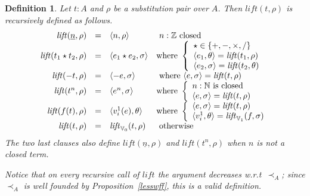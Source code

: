 \documentclass{article}
\newtheorem{definition}{Definition}[section]
\newcommand{\Z}{{\mathbb Z}}
\newcommand{\V}{{\mathbb V}}
\newcommand{\less}{\mathrel{\prec_A}}
\newcommand{\nat}{{\mathbb N}}
\newcommand{\liftv}[1]{\ensuremath{\mathit{lift}_{\V_{#1}}}}
\newcommand{\lift}{\ensuremath{\mathit{lift}}}
\begin{document}
\begin{definition}\label{defn:lift}
Let $t:A$ and $\rho$ be a substitution pair over $A$.  Then
$\lift(t,\rho)$ is recursively defined as follows.
\[
\begin{array}{rcll}
\lift(\underline n,\rho) & = & \langle n,\rho\rangle
 & \mbox{ $n:\Z$ closed}\\
\lift(t_1\star t_2,\rho) & = & \langle e_1\star e_2,\sigma\rangle
 & \mbox{where }\left\{\begin{array}l \star\in\{+,-,\times,/\}\\
                       \langle e_1,\theta\rangle=\lift(t_1,\rho)\\
                       \langle e_2,\sigma\rangle=\lift(t_2,\theta)
                       \end{array}\right. \\
\lift(-t,\rho) & = & \langle -e,\sigma\rangle
 & \mbox{ where $\langle e,\sigma\rangle=\lift(t,\rho)$}\\
\lift(t^n,\rho) & = & \langle e^n,\sigma\rangle
 & \mbox{where }\left\{\begin{array}l n:\nat\mbox{ is closed}\\
                       \langle e,\sigma\rangle=\lift(t,\rho)
                       \end{array}\right. \\
\lift(f(t),\rho) & = & \langle v^1_i(e),\theta\rangle
 & \mbox{where }\left\{\begin{array}l \langle e,\sigma\rangle=\lift(t,\rho)\\
                       \langle v^1_i,\theta\rangle=\liftv1(f,\sigma)
                       \end{array}\right. \\
\lift(t,\rho) & = & \liftv0(t,\rho) & \mbox{ otherwise}
\end{array}
\]
The two last clauses also define $\lift(\underline n,\rho)$ and
$\lift(t^n,\rho)$ when $n$ is not a closed term.

Notice that on every recursive call of $\lift$ the argument decreases
w.r.t\ $\less$; since $\less$ is well founded by
Proposition~\ref{lesswff}, this is a valid definition.
\end{definition}
\end{document}
